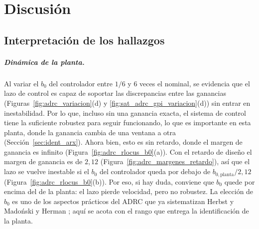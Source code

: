 \chapter{Discusión}
\label{cap:discusion}

\section{Interpretación de los hallazgos}
\label{sec:hipotesis_discusion}

\paragraph{Dinámica de la planta.} Al variar el $b_0$ del controlador entre $1/6$ y $6$ veces el
nominal, se evidencia que el lazo de control es capaz de soportar las discrepancias entre las
ganancias (Figuras~\ref{fig:adrc_variacion}(d) y \ref{fig:sat_adrc_gpi_variacion}(d)) sin entrar en
inestabilidad. Por lo que, incluso sin una ganancia exacta, el sistema de control tiene la suficiente
robustez para seguir funcionando, lo que es importante en esta planta, donde la ganancia cambia de una
ventana a otra (Sección~\ref{sec:ident_arx}). Ahora bien, esto es sin retardo, donde el margen de
ganancia es infinito (Figura~\ref{fig:adrc_rlocus_b0}(a)). Con el retardo de diseño el margen de
ganancia es de $2{,}12$ (Figura~\ref{fig:adrc_margenes_retardo}), así que el lazo se vuelve inestable
si el $b_0$ del controlador queda por debajo de $b_{0,\mathrm{planta}}/2{,}12$
(Figura~\ref{fig:adrc_rlocus_b0}(b)). Por eso, si hay duda, conviene que $b_0$ quede por encima del de
la planta: el lazo pierde velocidad, pero no robustez. La elección de $b_0$ es uno de los aspectos
prácticos del ADRC que ya sistematizan Herbst \cite{herbst2013practical} y Madoński y Herman
\cite{madonski2015survey}; aquí se acota con el rango que entrega la identificación de la planta.

